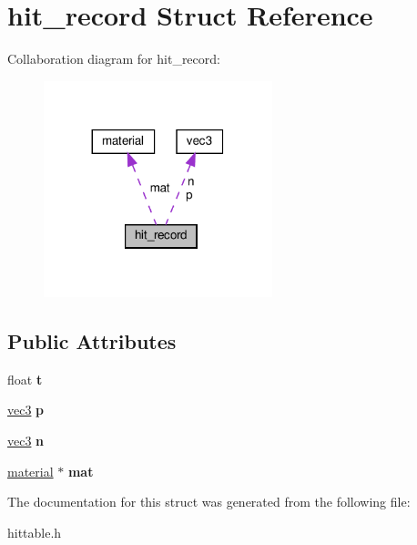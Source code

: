 \hypertarget{structhit__record}{}\section{hit\+\_\+record Struct Reference}
\label{structhit__record}


Collaboration diagram for hit\+\_\+record\+:
\nopagebreak
\begin{figure}[H]
\begin{center}
\leavevmode
\includegraphics[width=188pt]{structhit__record__coll__graph}
\end{center}
\end{figure}
\subsection*{Public Attributes}
\begin{DoxyCompactItemize}
\item 
\mbox{\label{structhit__record_a7f01fe93ab07f09e943f772c8f4d86b4}} 
float {\bfseries t}
\item 
\mbox{\label{structhit__record_af0d915768e7418302348430cb788836b}} 
\hyperlink{classvec3}{vec3} {\bfseries p}
\item 
\mbox{\label{structhit__record_a3314f2cb9d948b210769d0439c92a02e}} 
\hyperlink{classvec3}{vec3} {\bfseries n}
\item 
\mbox{\label{structhit__record_afa2214a5eefe5e0280deef41ab2ad8d0}} 
\hyperlink{classmaterial}{material} $\ast$ {\bfseries mat}
\end{DoxyCompactItemize}


The documentation for this struct was generated from the following file\+:\begin{DoxyCompactItemize}
\item 
hittable.\+h\end{DoxyCompactItemize}
